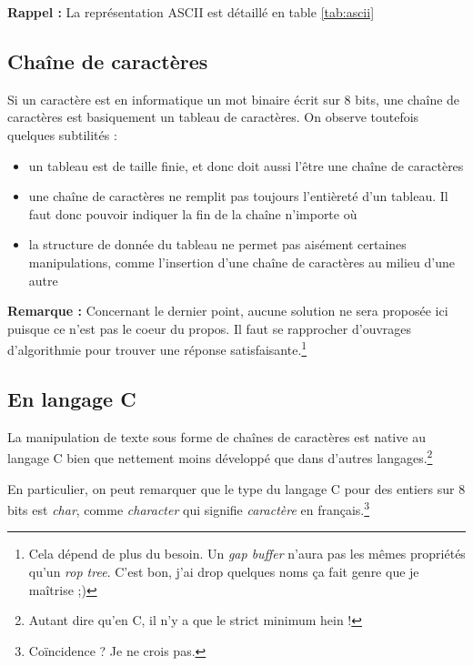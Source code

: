 \documentclass[../../../main.tex]{subfiles}
\begin{document}
\textbf{Rappel :} La représentation \textsf{ASCII} est détaillé en table \ref{tab:ascii}
\subsection{Chaîne de caractères}\label{sub:cha_ne_de_caract_res}
Si un caractère est en informatique un mot binaire écrit sur 8 bits, une chaîne de caractères est basiquement un tableau de caractères. On observe toutefois quelques subtilités :
\begin{itemize}
  \item un tableau est de taille finie, et donc doit aussi l'être une chaîne de caractères
  \item une chaîne de caractères ne remplit pas toujours l'entièreté d'un tableau. Il faut donc pouvoir indiquer la fin de la chaîne n'importe où
  \item la structure de donnée du tableau ne permet pas aisément certaines manipulations, comme l'insertion d'une chaîne de caractères au milieu d'une autre
\end{itemize}
\textbf{Remarque :} Concernant le dernier point, aucune solution ne sera proposée ici puisque ce n'est pas le coeur du propos. Il faut se rapprocher d'ouvrages d'algorithmie pour trouver une réponse satisfaisante.\footnote{Cela dépend de plus du besoin. Un \textit{gap buffer} n'aura pas les mêmes propriétés qu'un \textit{rop tree}. C'est bon, j'ai drop quelques noms ça fait genre que je maîtrise ;)}
\subsection{En langage C}\label{sub:en_langage_c}
La manipulation de texte sous forme de chaînes de caractères est native au langage C bien que nettement moins développé que dans d'autres langages.\footnote{Autant dire qu'en C, il n'y a que le strict minimum hein !}
 
En particulier, on peut remarquer que le type du langage C pour des entiers sur 8 bits est \textit{char}, comme \textit{character} qui signifie \textit{caractère} en français.\footnote{Coïncidence ? Je ne crois pas.}
 
\end{document}
